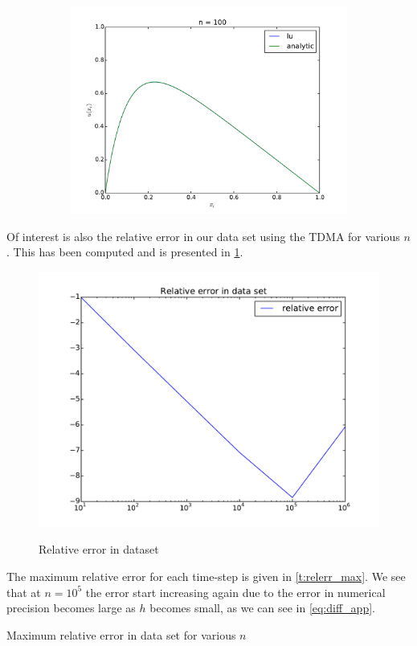 \documentclass[10pt,a4paper]{amsart}
\begin{document}
\begin{figure}[htb]
\begin{subfigure}{0.3\textwidth}
  \end{subfigure}
  \begin{subfigure}{0.3\textwidth}
    \includegraphics[width=\textwidth]{../plots/lu_100} 
  \end{subfigure}
\end{figure}

Of interest is also the relative error in our data set using the TDMA for various $n$. This has been computed and is presented in \cref{f:relerr}.

\begin{figure}[htb]
  \centering
  \caption{Relative error in dataset}
  \includegraphics[width=0.8\linewidth]{../plots/relative_error}
  \label{f:relerr}
\end{figure}

The maximum relative error for each time-step is given in \cref{t:relerr_max}.
We see that at $n = 10^5$ the error start increasing again due to the error in
numerical precision becomes large as $h$ becomes small, as we can see in
\cref{eq:diff_app}.
\begin{table}[h]
\caption{Maximum relative error in data set for various $n$}

\label{t:relerr_max}
\end{table}
\end{document}
